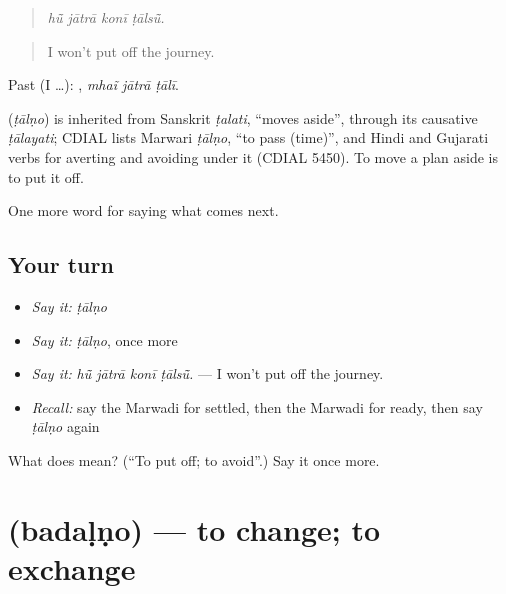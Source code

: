\begin{quote}
   
\end{quote}

\begin{quote}
\emph{hū̃ jātrā konī ṭālsū̃.}
\end{quote}

\begin{quote}
I won't put off the journey.
\end{quote}

Past (I …):   , \emph{mhaĩ jātrā ṭālī}.

\begin{cousinweb}
\textbf{} (\emph{ṭālṇo}) is inherited from Sanskrit \emph{ṭalati}, \textquotedblleft{}moves aside\textquotedblright{}, through its causative \emph{ṭālayati}; CDIAL lists Marwari \emph{ṭālṇo}, \textquotedblleft{}to pass (time)\textquotedblright{}, and Hindi and Gujarati verbs for averting and avoiding under it (CDIAL 5450). To move a plan aside is to put it off.
\end{cousinweb}

\begin{grammarlens}[title={What you've built}]
One more word for saying what comes next.
\end{grammarlens}

\subsection*{Your turn}
\begin{itemize}
\raggedright
  \item \emph{Say it:} \emph{ṭālṇo}
  \item \emph{Say it:} \emph{ṭālṇo}, once more
  \item \emph{Say it:} \emph{hū̃ jātrā konī ṭālsū̃.} — I won't put off the journey.
  \item \emph{Recall:} say the Marwadi for settled, then the Marwadi for ready, then say \emph{ṭālṇo} again
\end{itemize}

\begin{tcolorbox}[breakable,colback=teal!4,colframe=teal!35!black,title={Before you move on}]
What does  mean? (\textquotedblleft{}To put off; to avoid\textquotedblright{}.) Say it once more.
\end{tcolorbox}
\section[\texorpdfstring{\mw{बदळणो} (badaḷṇo)}{बदळणो (badaḷṇo)}]{ (badaḷṇo) — to change; to exchange}

